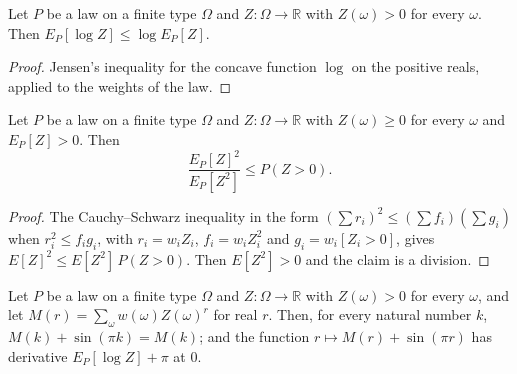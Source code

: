 \begin{theorem}
  \label{thm:physics-templada-recocida}
  \leanok
  Let $P$ be a law on a finite type $\Omega$ and $Z : \Omega \to \mathbb{R}$ with $Z(\omega) > 0$
  for every $\omega$. Then $E_P[\log Z] \le \log E_P[Z]$.
\end{theorem}

\begin{proof}
  \leanok
  Jensen's inequality for the concave function $\log$ on the positive reals, applied to the
  weights of the law.
\end{proof}

\begin{theorem}
  \label{thm:physics-paley-zygmund}
  \leanok
  Let $P$ be a law on a finite type $\Omega$ and $Z : \Omega \to \mathbb{R}$ with $Z(\omega) \ge 0$
  for every $\omega$ and $E_P[Z] > 0$. Then
  \[
    \frac{E_P[Z]^2}{E_P[Z^2]} \le P(Z > 0).
  \]
\end{theorem}

\begin{proof}
  \leanok
  The Cauchy--Schwarz inequality in the form $(\sum r_i)^2 \le (\sum f_i)(\sum g_i)$ when
  $r_i^2 \le f_i g_i$, with $r_i = w_i Z_i$, $f_i = w_i Z_i^2$ and $g_i = w_i [Z_i > 0]$, gives
  $E[Z]^2 \le E[Z^2]\,P(Z>0)$. Then $E[Z^2] > 0$ and the claim is a division.
\end{proof}

\begin{theorem}
  \label{thm:physics-enteros-no-bastan}
  \leanok
  Let $P$ be a law on a finite type $\Omega$ and $Z : \Omega \to \mathbb{R}$ with $Z(\omega) > 0$
  for every $\omega$, and let $M(r) = \sum_\omega w(\omega) Z(\omega)^r$ for real $r$. Then, for
  every natural number $k$, $M(k) + \sin(\pi k) = M(k)$; and the function
  $r \mapsto M(r) + \sin(\pi r)$ has derivative $E_P[\log Z] + \pi$ at $0$.
\end{theorem}

